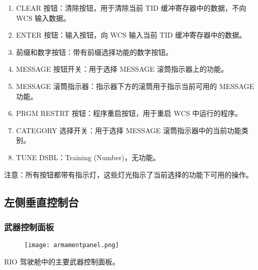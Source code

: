 \begin{enumerate}
	\item CLEAR 按钮：清除按钮，用于清除当前 TID 缓冲寄存器中的数据，不向 WCS 输入数据。
	\item ENTER 按钮：输入按钮，向 WCS 输入当前 TID 缓冲寄存器中的数据。
	\item 前缀和数字按钮：带有前缀选择功能的数字按钮。
	\item MESSAGE 按钮开关：用于选择 MESSAGE 滚筒指示器上的功能。
	\item MESSAGE 滚筒指示器：指示器下方的滚筒用于指示当前可用的 MESSAGE 功能。
	\item PRGM RESTRT 按钮：程序重启按钮，用于重启 WCS 中运行的程序。
	\item CATEGORY 选择开关：用于选择 MESSAGE 滚筒指示器中的当前功能类别。
	\item TUNE DSBL：Training (Number)，无功能。
\end{enumerate}
注意：所有按钮都带有指示灯，这些灯光指示了当前选择的功能下可用的操作。

\subsection{左侧垂直控制台}

\subsubsection{武器控制面板}
\begin{figure}[htb]
	\centering
	\texttt{[image: armamentpanel.png]}
\end{figure}
RIO 驾驶舱中的主要武器控制面板。

